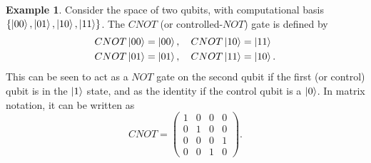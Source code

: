 \documentclass[12pt,a4paper]{report}
\numberwithin{equation}{section}
\theoremstyle{definition}
\theoremstyle{theorem}
\theoremstyle{theorem}
\theoremstyle{example}
\newtheorem{example}{Example}[section]
\theoremstyle{definition}
\begin{document}
\begin{example}
	Consider the space of two qubits, with computational basis $\{\ket{00},\ket{01},\ket{10},\ket{11}\}$. The $CNOT$ (or controlled-$NOT$) gate is defined by
	\begin{equation}
		\begin{aligned}
			CNOT\ket{00}&=\ket{00},\quad CNOT\ket{10}=\ket{11}\\
			CNOT\ket{01}&=\ket{01},\quad CNOT\ket{11}=\ket{10}.
		\end{aligned}
	\end{equation}
This can be seen to act as a $NOT$ gate on the second qubit if the first (or control) qubit is in the $\ket{1}$ state, and as the identity if the control qubit is a $\ket{0}$. In matrix notation, it can be written as
\begin{equation}
	CNOT=\begin{pmatrix}
		1&0&0&0\\0&1&0&0\\0&0&0&1\\0&0&1&0
	\end{pmatrix}.
\end{equation}
\end{example}
\end{document}
